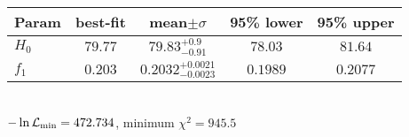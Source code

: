 \begin{tabular}{|l|c|c|c|c|} 
 \hline 
Param & best-fit & mean$\pm\sigma$ & 95\% lower & 95\% upper \\ \hline 
$H_{0 }$ &$79.77$ & $79.83_{-0.91}^{+0.9}$ & $78.03$ & $81.64$ \\ 
$f_{1 }$ &$0.203$ & $0.2032_{-0.0023}^{+0.0021}$ & $0.1989$ & $0.2077$ \\ 
\hline 
 \end{tabular} \\ 
$-\ln{\cal L}_\mathrm{min} =472.734$, minimum $\chi^2=945.5$ \\ 
